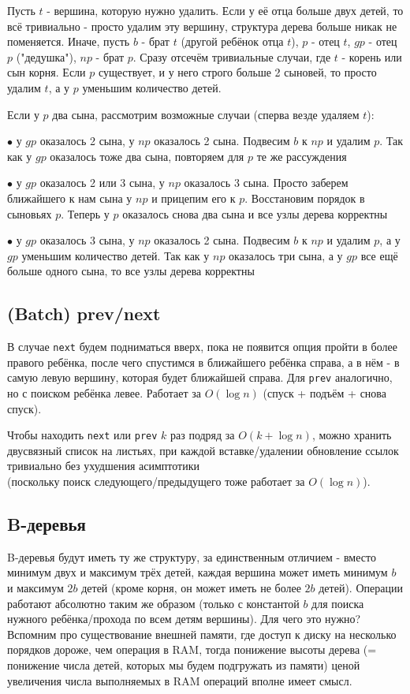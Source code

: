 Пусть $t$ - вершина, которую нужно удалить. Если у её отца больше двух детей, то всё тривиально - просто удалим эту вершину, структура дерева больше никак не поменяется. Иначе, пусть $b$ - брат $t$ (другой ребёнок отца $t$), $p$ - отец $t$, $gp$ - отец $p$ ("дедушка"), $np$ - брат $p$. Сразу отсечём тривиальные случаи, где $t$ - корень или сын корня. Если $p$ существует, и у него строго больше 2 сыновей, то просто удалим $t$, а у $p$ уменьшим количество детей.

Если у $p$ два сына, рассмотрим возможные случаи (сперва везде удаляем $t$):

$\bullet$ у $gp$ оказалось 2 сына, у $np$ оказалось 2 сына. Подвесим $b$ к $np$ и удалим $p$. Так как у $gp$ оказалось тоже два сына, повторяем для $p$ те же рассуждения

$\bullet$ у $gp$ оказалось 2 или 3 сына, у $np$ оказалось 3 сына. Просто заберем ближайшего к нам сына у $np$ и прицепим его к $p$. Восстановим порядок в сыновьях $p$. Теперь у $p$ оказалось снова два сына и все узлы дерева корректны

$\bullet$ у $gp$ оказалось 3 сына, у $np$ оказалось 2 сына. Подвесим $b$ к $np$ и удалим $p$, а у $gp$ уменьшим количество детей. Так как у $np$ оказалось три сына, а у $gp$ все ещё больше одного сына, то все узлы дерева корректны

\subsection{(Batch) prev/next}

В случае \texttt{next} будем подниматься вверх, пока не появится опция пройти в более правого ребёнка, после чего спустимся в ближайшего ребёнка справа, а в нём - в самую левую вершину, которая будет ближайшей справа. Для \texttt{prev} аналогично, но с поиском ребёнка левее. Работает за $O(\log n)$ (спуск + подъём + снова спуск).

Чтобы находить \texttt{next} или \texttt{prev} $k$ раз подряд за $O(k + \log n)$, можно хранить двусвязный список на листьях, при каждой вставке/удалении обновление ссылок тривиально без ухудшения асимптотики \\ (поскольку поиск следующего/предыдущего тоже работает за $O(\log n)$).

\subsection{B-деревья}

B-деревья будут иметь ту же структуру, за единственным отличием - вместо минимум двух и максимум трёх детей, каждая вершина может иметь минимум $b$ и максимум $2b$ детей (кроме корня, он может иметь не более $2b$ детей). Операции работают абсолютно таким же образом (только с константой $b$ для поиска нужного ребёнка/прохода по всем детям вершины). Для чего это нужно? Вспомним про существование внешней памяти, где доступ к диску на несколько порядков дороже, чем операция в RAM, тогда понижение высоты дерева (= понижение числа детей, которых мы будем подгружать из памяти) ценой увеличения числа выполняемых в RAM операций вполне имеет смысл.
